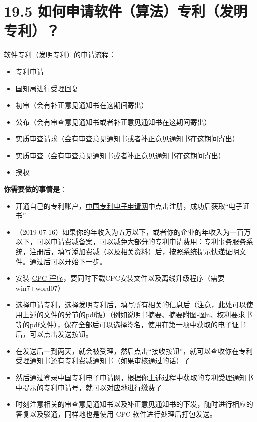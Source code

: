 \section{19.5
如何申请软件（算法）专利（发明专利）？}\label{ux5982ux4f55ux7533ux8bf7ux8f6fux4ef6ux7b97ux6cd5ux4e13ux5229ux53d1ux660eux4e13ux5229}

软件专利（发明专利）的申请流程：

\begin{itemize}
\item
  专利申请
\item
  国知局进行受理回复
\item
  初审（会有补正意见通知书在这期间寄出）
\item
  公布（会有审查意见通知书或者补正意见通知书在这期间寄出）
\item
  实质审查请求（会有审查意见通知书或者补正意见通知书在这期间寄出）
\item
  实质审查（会有审查意见通知书或者补正意见通知书在这期间寄出）
\item
  授权
\end{itemize}

\textbf{你需要做的事情是}：

\begin{itemize}
\item
  开通自己的专利账户，\href{http://cponline.sipo.gov.cn/}{中国专利电子申请网}中点击注册，成功后获取``电子证书''
\item
  （2019-07-16）如果你的年收入为五万以下，或者你的企业的年收入为一百万以下，可以申请费减备案，可以减免大部分的专利申请费用：\href{http://cpservice.sipo.gov.cn/index.jsp}{专利事务服务系统}，注册后，填写添加费减（以及相关资料）后，按照系统提示快递证明文件。通过后可以开始下一步。
\item
  安装 \href{http://cponline.sipo.gov.cn/tooldown/index.jhtml}{CPC
  程序}，要同时下载CPC安装文件以及离线升级程序（需要win7+word07）
\item
  选择申请专利，选择发明专利后，填写所有相关的信息后（注意，此处可以使用上述的文件的分节的pdf版）（例如说明书摘要、摘要附图-图n、权利要求书等的pdf文件），保存全部后可以选择签名，使用在第一项中获取的电子证书后，可以点击发送按钮。
\item
  在发送后一到两天，就会被受理，然后点击``接收按钮''，就可以查收你在专利受理通知书还有专利费减通知书（如果审核通过的话）了
\item
  然后通过登录\href{http://cponline.sipo.gov.cn/}{中国专利电子申请网}，根据你上述过程中获取的专利受理通知书中提示的专利申请号，就可以对应地进行缴费了
\item
  时刻注意相关的审查意见通知书以及补正意见通知书的下发，随时进行相应的答复以及驳通，同样地也是使用
  CPC 软件进行处理后打包发送。
\end{itemize}

